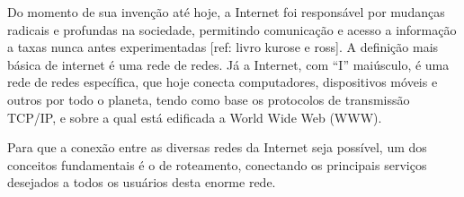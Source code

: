 
\bacharelado {}
\data {\today}



\ttorientador{$ $}
\ttexaminadorum{$ $}
\ttexaminadordois{$ $}

\newpage
\pagestyle{empty}

\maketitle




Do momento de sua invenção até hoje, a Internet foi responsável por mudanças radicais e profundas na sociedade, permitindo comunicação e acesso a informação a taxas nunca antes experimentadas [ref: livro kurose e ross].
A definição mais básica de internet é uma rede de redes. Já a Internet, com “I” maiúsculo, é uma rede de redes específica, que hoje conecta computadores, dispositivos móveis e outros por todo o planeta, tendo como base os protocolos de transmissão TCP/IP, e sobre a qual está edificada a World Wide Web (WWW).

Para que a conexão entre as diversas redes da Internet seja possível, um dos conceitos fundamentais é o de roteamento, conectando os principais serviços desejados a todos os usuários desta enorme rede.

